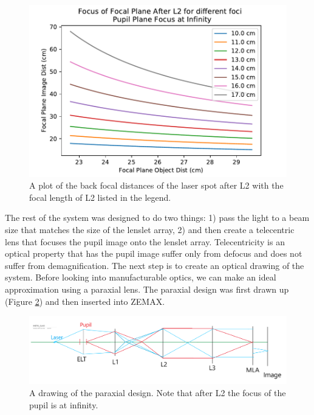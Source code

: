 \begin{figure}[h!]
\centering
\includegraphics[width=14 cm]{Figures/L2_varying_focus.pdf}
\caption{A plot of the back focal distances of the laser spot after L2 with the focal 
length of L2 listed in the legend.}
\label{fig:L2}
\end{figure}

The rest of the system was designed to do two things: 1) pass the light to a beam
size that matches the size of the lenslet array, 2) and then create a telecentric
lens that focuses the pupil image onto the lenslet array.  Telecentricity is an 
optical property that has the pupil image suffer only from defocus and does not 
suffer from demagnification.
The next step is to create an optical drawing of the system.  Before looking into
manufacturable optics, we can make an ideal approximation using a paraxial lens.
The paraxial design was first drawn up (Figure \ref{fig:paraxial_draw}) and then
inserted into ZEMAX.

\begin{figure}[h!]
\centering
\includegraphics[width=14 cm]{Figures/paraxial_draw.png}
\caption{A drawing of the paraxial design.  Note that after L2 the focus of the pupil is at infinity.}
\label{fig:paraxial_draw}
\end{figure}


